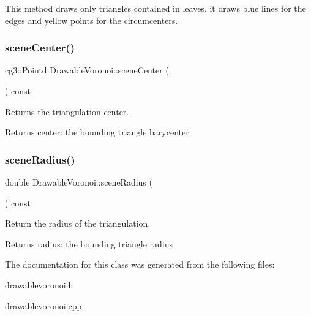 This method draws only triangles contained in leaves, it draws blue lines for the edges and yellow points for the circumcenters. \mbox{\label{classDrawableVoronoi_a1707c9e575880eeac9e981d73e03b3bf}} 
\subsubsection{\texorpdfstring{scene\+Center()}{sceneCenter()}}
{\footnotesize\ttfamily cg3\+::\+Pointd Drawable\+Voronoi\+::scene\+Center (\begin{DoxyParamCaption}{ }\end{DoxyParamCaption}) const}



Returns the triangulation center. 

\begin{DoxyReturn}{Returns}
center\+: the bounding triangle barycenter 
\end{DoxyReturn}
\mbox{\label{classDrawableVoronoi_af26652a83c96748bf9a09abc6255672b}} 
\subsubsection{\texorpdfstring{scene\+Radius()}{sceneRadius()}}
{\footnotesize\ttfamily double Drawable\+Voronoi\+::scene\+Radius (\begin{DoxyParamCaption}{ }\end{DoxyParamCaption}) const}



Return the radius of the triangulation. 

\begin{DoxyReturn}{Returns}
radius\+: the bounding triangle radius 
\end{DoxyReturn}


The documentation for this class was generated from the following files\+:\begin{DoxyCompactItemize}
\item 
drawablevoronoi.\+h\item 
drawablevoronoi.\+cpp\end{DoxyCompactItemize}
